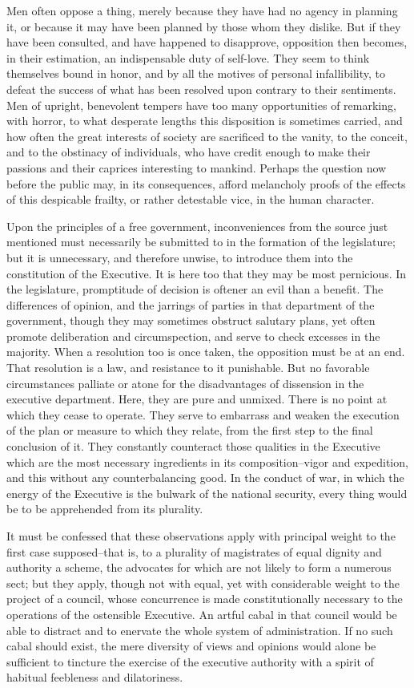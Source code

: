 Men often oppose a thing, merely because they have had no agency in planning it, or because it may have been planned by those whom they dislike. But if they have been consulted, and have happened to disapprove, opposition then becomes, in their estimation, an indispensable duty of self-love. They seem to think themselves bound in honor, and by all the motives of personal infallibility, to defeat the success of what has been resolved upon contrary to their sentiments. Men of upright, benevolent tempers have too many opportunities of remarking, with horror, to what desperate lengths this disposition is sometimes carried, and how often the great interests of society are sacrificed to the vanity, to the conceit, and to the obstinacy of individuals, who have credit enough to make their passions and their caprices interesting to mankind. Perhaps the question now before the public may, in its consequences, afford melancholy proofs of the effects of this despicable frailty, or rather detestable vice, in the human character.

Upon the principles of a free government, inconveniences from the source just mentioned must necessarily be submitted to in the formation of the legislature; but it is unnecessary, and therefore unwise, to introduce them into the constitution of the Executive. It is here too that they may be most pernicious. In the legislature, promptitude of decision is oftener an evil than a benefit. The differences of opinion, and the jarrings of parties in that department of the government, though they may sometimes obstruct salutary plans, yet often promote deliberation and circumspection, and serve to check excesses in the majority. When a resolution too is once taken, the opposition must be at an end. That resolution is a law, and resistance to it punishable. But no favorable circumstances palliate or atone for the disadvantages of dissension in the executive department. Here, they are pure and unmixed. There is no point at which they cease to operate. They serve to embarrass and weaken the execution of the plan or measure to which they relate, from the first step to the final conclusion of it. They constantly counteract those qualities in the Executive which are the most necessary ingredients in its composition--vigor and expedition, and this without any counterbalancing good. In the conduct of war, in which the energy of the Executive is the bulwark of the national security, every thing would be to be apprehended from its plurality.

It must be confessed that these observations apply with principal weight to the first case supposed--that is, to a plurality of magistrates of equal dignity and authority a scheme, the advocates for which are not likely to form a numerous sect; but they apply, though not with equal, yet with considerable weight to the project of a council, whose concurrence is made constitutionally necessary to the operations of the ostensible Executive. An artful cabal in that council would be able to distract and to enervate the whole system of administration. If no such cabal should exist, the mere diversity of views and opinions would alone be sufficient to tincture the exercise of the executive authority with a spirit of habitual feebleness and dilatoriness.

